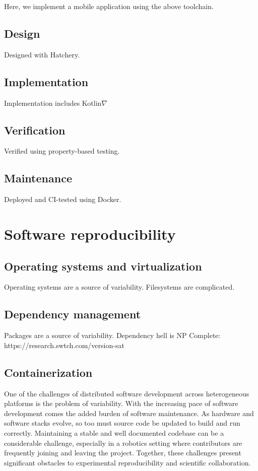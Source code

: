 \documentclass[12pt,initial,twoside,maitrise]{dms}
\numberwithin{equation}{section}
\numberwithin{table}{chapter}
\numberwithin{figure}{chapter}
\begin{document}
Here, we implement a mobile application using the above toolchain.

\section{Design}

Designed with Hatchery.

\section{Implementation}

Implementation includes Kotlin$\nabla$

\section{Verification}

Verified using property-based testing.

\section{Maintenance}

Deployed and CI-tested using Docker.

\chapter{Software reproducibility}

\section{Operating systems and virtualization}

Operating systems are a source of variability. Filesystems are complicated.

\section{Dependency management}

Packages are a source of variability. Dependency hell is NP Complete: https://research.swtch.com/version-sat

\section{Containerization}

One of the challenges of distributed software development across heterogeneous platforms is the problem of variability. With the increasing pace of software development comes the added burden of software maintenance. As hardware and software stacks evolve, so too must source code be updated to build and run correctly. Maintaining a stable and well documented codebase can be a considerable challenge, especially in a robotics setting where contributors are frequently joining and leaving the project. Together, these challenges present significant obstacles to experimental reproducibility and scientific collaboration.
\end{document}
